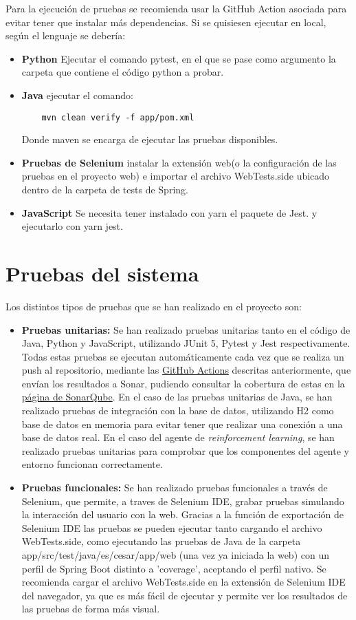 Para la ejecución de pruebas se recomienda usar la GitHub Action asociada para evitar tener que instalar más dependencias. Si se quisiesen ejecutar en local, según el lenguaje se debería:
\begin{itemize}
    \item \textbf{Python} Ejecutar el comando pytest, en el que se pase como argumento la carpeta que contiene el código python a probar.
    \item \textbf{Java} ejecutar el comando:
    \begin{verbatim} 
    mvn clean verify -f app/pom.xml
    \end{verbatim}
    Donde maven se encarga de ejecutar las pruebas disponibles.
    \item \textbf{Pruebas de Selenium} instalar la extensión web(o la configuración de las pruebas en el proyecto web) e importar el archivo WebTests.side ubicado dentro de la carpeta de tests de Spring.
    \item \textbf{JavaScript} Se necesita tener instalado con yarn el paquete de Jest. y ejecutarlo con yarn jest.
\end{itemize}

\section{Pruebas del sistema}
\label{sec:pruebas}

Los distintos tipos de pruebas que se han realizado en el proyecto son:
\begin{itemize}
    \item \textbf{Pruebas unitarias:} Se han realizado pruebas unitarias tanto  en el código de Java, Python y JavaScript, utilizando JUnit 5, Pytest y Jest respectivamente. Todas estas pruebas se ejecutan automáticamente cada vez que se realiza un push al repositorio, mediante las \hyperref[subsec:acciones]{GitHub Actions} descritas anteriormente, que envían los resultados a Sonar, pudiendo consultar la cobertura de estas en la \hyperref[subsec:sonarqube]{página de SonarQube}. 
    En el caso de las pruebas unitarias de Java, se han realizado pruebas de integración con la base de datos, utilizando H2 como base de datos en memoria para evitar tener que realizar una conexión a una base de datos real. En el caso del agente de \textit{reinforcement learning}, se han realizado pruebas unitarias para comprobar que los componentes del agente y entorno funcionan correctamente.
    \item \textbf{Pruebas funcionales:} Se han realizado pruebas funcionales a través de Selenium, que permite, a traves de Selenium IDE, grabar pruebas simulando la interacción del usuario con la web. Gracias a la función de exportación de Selenium IDE las pruebas se pueden ejecutar tanto cargando el archivo WebTests.side, como ejecutando las pruebas de Java de la carpeta app/src/test/java/es/cesar/app/web (una vez ya iniciada la web) con un perfil de Spring Boot distinto a 'coverage', aceptando el perfil nativo. Se recomienda cargar el archivo WebTests.side en la extensión de Selenium IDE del navegador, ya que es más fácil de ejecutar y permite ver los resultados de las pruebas de forma más visual.
\end{itemize}

